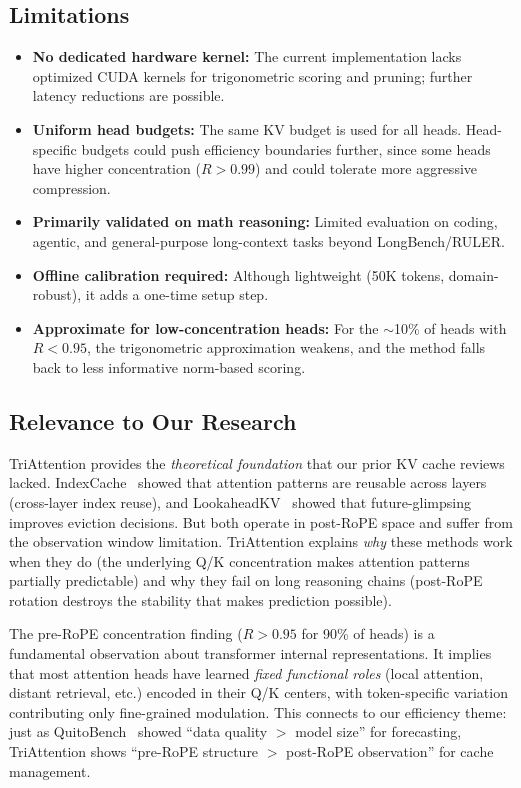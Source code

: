 \documentclass[11pt]{article}
\begin{document}
\subsection{Limitations}

\begin{itemize}
    \item \textbf{No dedicated hardware kernel:} The current implementation lacks optimized CUDA kernels for trigonometric scoring and pruning; further latency reductions are possible.
    \item \textbf{Uniform head budgets:} The same KV budget is used for all heads. Head-specific budgets could push efficiency boundaries further, since some heads have higher concentration ($R > 0.99$) and could tolerate more aggressive compression.
    \item \textbf{Primarily validated on math reasoning:} Limited evaluation on coding, agentic, and general-purpose long-context tasks beyond LongBench/RULER.
    \item \textbf{Offline calibration required:} Although lightweight (50K tokens, domain-robust), it adds a one-time setup step.
    \item \textbf{Approximate for low-concentration heads:} For the $\sim$10\% of heads with $R < 0.95$, the trigonometric approximation weakens, and the method falls back to less informative norm-based scoring.
\end{itemize}

\subsection{Relevance to Our Research}

TriAttention provides the \textit{theoretical foundation} that our prior KV cache reviews lacked. IndexCache~\cite{indexcache} showed that attention patterns are reusable across layers (cross-layer index reuse), and LookaheadKV~\cite{lookaheadkv} showed that future-glimpsing improves eviction decisions. But both operate in post-RoPE space and suffer from the observation window limitation. TriAttention explains \textit{why} these methods work when they do (the underlying Q/K concentration makes attention patterns partially predictable) and why they fail on long reasoning chains (post-RoPE rotation destroys the stability that makes prediction possible).

The pre-RoPE concentration finding ($R > 0.95$ for 90\% of heads) is a fundamental observation about transformer internal representations. It implies that most attention heads have learned \textit{fixed functional roles} (local attention, distant retrieval, etc.) encoded in their Q/K centers, with token-specific variation contributing only fine-grained modulation. This connects to our efficiency theme: just as QuitoBench~\cite{quitobench} showed ``data quality $>$ model size'' for forecasting, TriAttention shows ``pre-RoPE structure $>$ post-RoPE observation'' for cache management.
\end{document}
